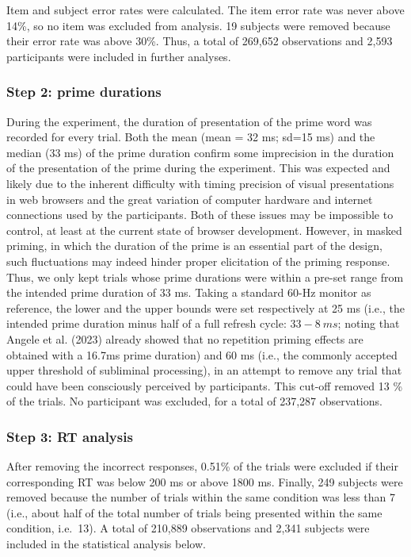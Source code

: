 \documentclass[
]{interact}
\begin{document}
Item and subject error rates were calculated. The item error rate was
never above 14\%, so no item was excluded from analysis. 19 subjects
were removed because their error rate was above 30\%. Thus, a total of
269,652 observations and 2,593 participants were included in further
analyses.

\subsubsection{Step 2: prime
durations}\label{sec-exp1-analysis-primeTime}

During the experiment, the duration of presentation of the prime word
was recorded for every trial. Both the mean (mean = 32 ms; sd=15 ms) and
the median (33 ms) of the prime duration confirm some imprecision in the
duration of the presentation of the prime during the experiment. This
was expected and likely due to the inherent difficulty with timing
precision of visual presentations in web browsers and the great
variation of computer hardware and internet connections used by the
participants. Both of these issues may be impossible to control, at
least at the current state of browser development. However, in masked
priming, in which the duration of the prime is an essential part of the
design, such fluctuations may indeed hinder proper elicitation of the
priming response. Thus, we only kept trials whose prime durations were
within a pre-set range from the intended prime duration of 33 ms. Taking
a standard 60-Hz monitor as reference, the lower and the upper bounds
were set respectively at 25 ms (i.e., the intended prime duration minus
half of a full refresh cycle: \(33-8~ ms\); noting that Angele et al.
(2023) already showed that no repetition priming effects are obtained
with a 16.7ms prime duration) and 60 ms (i.e., the commonly accepted
upper threshold of subliminal processing), in an attempt to remove any
trial that could have been consciously perceived by participants. This
cut-off removed 13 \% of the trials. No participant was excluded, for a
total of 237,287 observations.

\subsubsection{Step 3: RT analysis}\label{sec-exp1-analysis-RT}

After removing the incorrect responses, 0.51\% of the trials were
excluded if their corresponding RT was below 200 ms or above 1800 ms.
Finally, 249 subjects were removed because the number of trials within
the same condition was less than 7 (i.e., about half of the total number
of trials being presented within the same condition, i.e.~13). A total
of 210,889 observations and 2,341 subjects were included in the
statistical analysis below.
\end{document}
